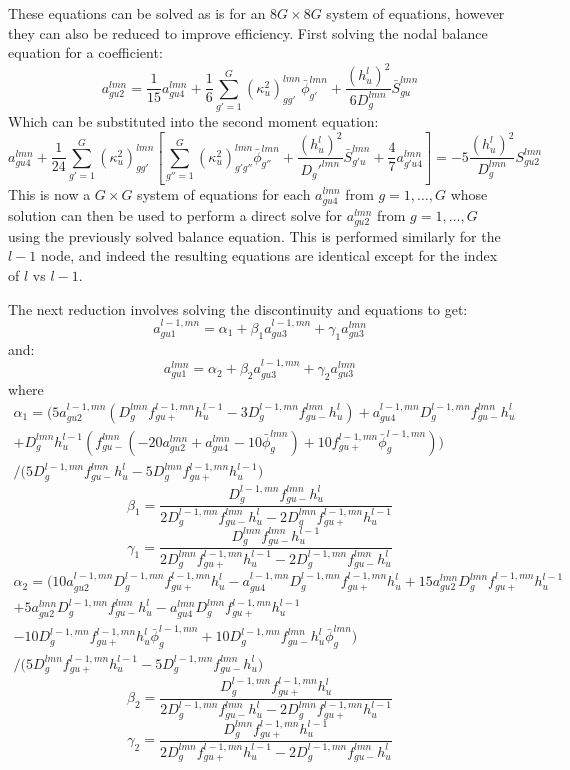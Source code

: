 These equations can be solved as is for an $8G\times 8G$ system of equations, however they can also be reduced to improve efficiency.
First solving the nodal balance equation for a coefficient:
\[
a_{gu2}^{lmn}=\frac{1}{15}a_{gu4}^{lmn}+\frac{1}{6}\sum_{g'=1}^G(\kappa_u^2)_{gg'}^{lmn}\bar{\phi}_{g'}^{lmn}+\frac{(h_u^{l})^2}{6D_g^{lmn}}\bar{S}_{gu}^{lmn}
\]
Which can be substituted into the second moment equation:
\[
a_{gu4}^{lmn}+\frac{1}{24}\sum_{g'=1}^G(\kappa_u^2)_{gg'}^{lmn}\left[\sum_{g''=1}^G(\kappa_u^2)_{g'g''}^{lmn}\bar{\phi}_{g''}^{lmn}+\frac{(h_u^{l})^2}{D_g'^{lmn}}\bar{S}_{g'u}^{lmn}+\frac{4}{7}a_{g'u4}^{lmn}\right]=-5\frac{(h_u^{l})^2}{D_g^{lmn}}S_{gu2}^{lmn}
\]
This is now a $G\times G$ system of equations for each $a_{gu4}^{lmn}$ from $g=1,\dots,G$ whose solution can then be used to perform a direct solve for $a_{gu2}^{lmn}$ from $g=1,\dots,G$ using the previously solved balance equation.
This is performed similarly for the $l-1$ node, and indeed the resulting equations are identical except for the index of $l$ vs $l-1$.

The next reduction involves solving the discontinuity and equations to get:
\[
a_{gu1}^{l-1,mn}=\alpha_1+\beta_1a_{gu3}^{l-1,mn}+\gamma_1a_{gu3}^{lmn}
\]
and:
\[
a_{gu1}^{lmn}=\alpha_2+\beta_2a_{gu3}^{l-1,mn}+\gamma_2a_{gu3}^{lmn}
\]
where
\begin{multline*}
\alpha_1=\bigg(5 a_{gu2}^{l-1,mn} (D_g^{lmn} f_{gu+}^{l-1,mn} h_u^{l-1}-3 D_g^{l-1,mn} f_{gu-}^{lmn} h_u^{l})+a_{gu4}^{l-1,mn} D_g^{l-1,mn} f_{gu-}^{lmn} h_u^{l}\\
+D_g^{lmn} h_u^{l-1} (f_{gu-}^{lmn} (-20 a_{gu2}^{lmn}+a_{gu4}^{lmn}-10 \bar{\phi}_{g}^{lmn})+10 f_{gu+}^{l-1,mn} \bar{\phi}_{g}^{l-1,mn})\bigg)\\
/
\bigg(5 D_g^{l-1,mn} f_{gu-}^{lmn} h_u^{l}-5 D_g^{lmn} f_{gu+}^{l-1,mn} h_u^{l-1}\bigg)
\end{multline*}
\[
\beta_1=\frac{D_g^{l-1,mn} f_{gu-}^{lmn} h_u^{l}}{2 D_g^{l-1,mn} f_{gu-}^{lmn} h_u^{l}-2 D_g^{lmn} f_{gu+}^{l-1,mn} h_u^{l-1}}
\]
\[
\gamma_1=\frac{D_g^{lmn} f_{gu-}^{lmn} h_u^{l-1}}{2 D_g^{lmn} f_{gu+}^{l-1,mn} h_u^{l-1}-2 D_g^{l-1,mn} f_{gu-}^{lmn} h_u^{l}}
\]
\begin{multline*}
\alpha_2=\bigg(10 a_{gu2}^{l-1,mn} D_g^{l-1,mn} f_{gu+}^{l-1,mn} h_u^{l}-a_{gu4}^{l-1,mn} D_g^{l-1,mn} f_{gu+}^{l-1,mn} h_u^{l}+15 a_{gu2}^{lmn} D_g^{lmn} f_{gu+}^{l-1,mn} h_u^{l-1}\\
+5 a_{gu2}^{lmn} D_g^{l-1,mn} f_{gu-}^{lmn} h_u^{l}-a_{gu4}^{lmn} D_g^{lmn} f_{gu+}^{l-1,mn} h_u^{l-1}\\
-10 D_g^{l-1,mn} f_{gu+}^{l-1,mn} h_u^{l} \bar{\phi}_{g}^{l-1,mn}+10 D_g^{l-1,mn} f_{gu-}^{lmn} h_u^{l} \bar{\phi}_{g}^{lmn}\bigg)\\
/\bigg(5 D_g^{lmn} f_{gu+}^{l-1,mn} h_u^{l-1}-5 D_g^{l-1,mn} f_{gu-}^{lmn} h_u^{l}\bigg)
\end{multline*}
\[
\beta_2=\frac{D_g^{l-1,mn} f_{gu+}^{l-1,mn} h_u^{l}}{2 D_g^{l-1,mn} f_{gu-}^{lmn} h_u^{l}-2 D_g^{lmn} f_{gu+}^{l-1,mn} h_u^{l-1}}
\]
\[
\gamma_2=\frac{D_g^{lmn} f_{gu+}^{l-1,mn} h_u^{l-1}}{2 D_g^{lmn} f_{gu+}^{l-1,mn} h_u^{l-1}-2 D_g^{l-1,mn} f_{gu-}^{lmn} h_u^{l}}
\]

